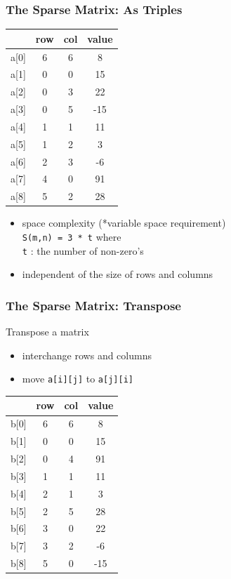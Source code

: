\documentclass[newPxFont,sthlmFooter,nooffset]{beamer}
\begin{document}
\begin{frame}[t, fragile]
  \frametitle{The Sparse Matrix: As Triples}
  \begin{center}
    \begin{tabular}{r c c c}
      & row & col & value \\ \hline
      a[0]&  6  &  6  &   8   \\
      a[1]&  0  &  0  &  15   \\ 
      a[2]&  0  &  3  &  22   \\ 
      a[3]&  0  &  5  & -15   \\ 
      a[4]&  1  &  1  &  11   \\ 
      a[5]&  1  &  2  &   3   \\ 
      a[6]&  2  &  3  &  -6   \\ 
      a[7]&  4  &  0  &  91   \\ 
      a[8]&  5  &  2  &  28   \\ 
    \end{tabular}
  \end{center}
  \begin{itemize}
  \item space complexity (*variable space requirement) \\
\texttt{S(m,n) = 3 * t} where \\
\texttt{t} : the number of non-zero’s
\item independent of the size of rows and columns
  \end{itemize}

\end{frame}

\begin{frame}[t, fragile]
  \frametitle{The Sparse Matrix: Transpose}
Transpose a matrix
\begin{itemize}
\item interchange rows and columns
\item move \texttt{a[i][j]} to \texttt{a[j][i]}
\end{itemize}
  \begin{center}
    \begin{tabular}{r c c c}
      & row & col & value \\ \hline
      b[0]&  6  &  6  &   8   \\
      b[1]&  0  &  0  &  15   \\ 
      b[2]&  0  &  4  &  91   \\ 
      b[3]&  1  &  1  &  11   \\ 
      b[4]&  2  &  1  &   3   \\ 
      b[5]&  2  &  5  &  28   \\ 
      b[6]&  3  &  0  &  22   \\ 
      b[7]&  3  &  2  &  -6   \\ 
      b[8]&  5  &  0  &  -15   \\ 
    \end{tabular}
  \end{center}
\end{frame}
\end{document}
